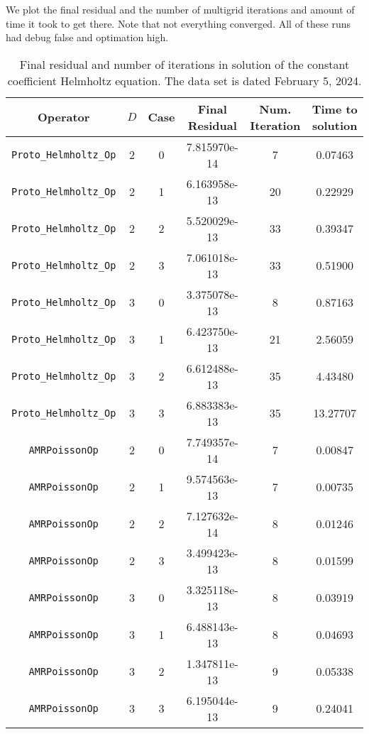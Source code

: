 \documentclass{article}
\begin{document}
We plot the final residual and the  number of multigrid iterations and
amount of time it took to get there. Note that not everything
converged. All of these runs had debug false and optimation high.


\begin{small}
\begin{table}
\begin{center}
\begin{tabular}{|c|c|c|c|c||c|} \hline
 Operator                   & $D$ & Case & Final Residual &
 Num. Iteration & Time to solution\\
\hline
 {\tt Proto\_Helmholtz\_Op}       & 2   & 0    &   7.815970e-14 &         7  & 0.07463  \\
 {\tt Proto\_Helmholtz\_Op}       & 2   & 1    &   6.163958e-13 &         20 & 0.22929  \\
 {\tt Proto\_Helmholtz\_Op}       & 2   & 2    &   5.520029e-13 &         33 & 0.39347  \\
 {\tt Proto\_Helmholtz\_Op}       & 2   & 3    &   7.061018e-13 &         33 & 0.51900  \\
 {\tt Proto\_Helmholtz\_Op}       & 3   & 0    &   3.375078e-13 &         8  & 0.87163  \\
 {\tt Proto\_Helmholtz\_Op}       & 3   & 1    &   6.423750e-13 &         21 & 2.56059  \\
 {\tt Proto\_Helmholtz\_Op}       & 3   & 2    &   6.612488e-13 &         35 & 4.43480  \\
 {\tt Proto\_Helmholtz\_Op}       & 3   & 3    &   6.883383e-13 &         35 & 13.27707 \\
 \hline                                                                       
 {\tt AMRPoissonOp}               & 2   & 0    &   7.749357e-14 &         7  & 0.00847\\
 {\tt AMRPoissonOp}               & 2   & 1    &   9.574563e-13 &         7  & 0.00735\\
 {\tt AMRPoissonOp}               & 2   & 2    &   7.127632e-14 &         8  & 0.01246\\
 {\tt AMRPoissonOp}               & 2   & 3    &   3.499423e-13 &         8  & 0.01599\\
 {\tt AMRPoissonOp}               & 3   & 0    &   3.325118e-13 &         8  & 0.03919\\
 {\tt AMRPoissonOp}               & 3   & 1    &   6.488143e-13 &         8  & 0.04693\\
 {\tt AMRPoissonOp}               & 3   & 2    &   1.347811e-13 &         9  & 0.05338\\
 {\tt AMRPoissonOp}               & 3   & 3    &   6.195044e-13 &         9  & 0.24041\\
\hline
\end{tabular}
\end{center}
\label{tab::helmholtz1}
\caption
    {
      Final residual and number of iterations in solution of the  constant
      coefficient Helmholtz equation.
      The data set is dated February 5, 2024.
    }
\end{table}
\end{small}
\end{document}
